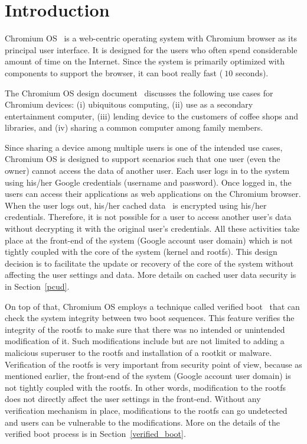 \documentclass[11pt]{article}
\begin{document}

\section{Introduction}
\label{introduction}
Chromium OS~\cite{cros} is a web-centric operating system with Chromium browser as its principal user interface. It is designed for the users who often spend considerable amount of time on the Internet. Since the system is primarily optimized with components to support the browser, it can boot really fast ($~10$ seconds).

The Chromium OS design document~\cite{secoverview} discusses the following use cases for Chromium devices: (i) ubiquitous computing, (ii) use as a secondary entertainment computer, (iii) lending device to the customers of coffee shops and libraries, and (iv) sharing a common computer among family members.

Since sharing a device among multiple users is one of the intended use cases, Chromium OS is designed to support scenarios such that one user (even the owner) cannot access the data of another user. Each user logs in to the system using his/her Google credentials (username and password). Once logged in, the users can access their applications as web applications on the Chromium browser. When the user logs out, his/her cached data~\cite{pcud} is encrypted using his/her credentials. Therefore, it is not possible for a user to access another user's data without decrypting it with the original user's credentials. All these activities take place at the front-end of the system (Google account user domain) which is not tightly coupled with the core of the system (kernel and rootfs). This design decision is to facilitate the update or recovery of the core of the system without affecting the user settings and data. More details on cached user data security is in Section~\ref{pcud}.


On top of that, Chromium OS employs a technique called verified boot~\cite{verifiedboot} that can check the system integrity between two boot sequences. This feature verifies the integrity of the rootfs to make sure that there was no intended or unintended modification of it. Such modifications include but are not limited to adding a malicious superuser to the rootfs and installation of a rootkit or malware. Verification of the rootfs is very important from security point of view, because as mentioned earlier, the front-end of the system (Google account user domain) is not tightly coupled with the rootfs. In other words, modification to the rootfs does not directly affect the user settings in the front-end. Without any verification mechanism in place, modifications to the rootfs can go undetected and users can be vulnerable to the modifications. More on the details of the verified boot process is in Section~\ref{verified_boot}.
\end{document}

